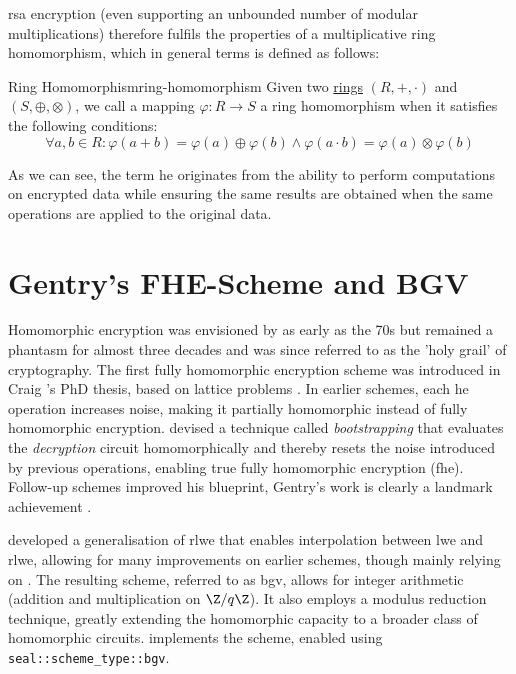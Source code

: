 \gls{rsa} encryption (even supporting an unbounded number of modular multiplications) therefore fulfils the properties of a multiplicative ring homomorphism, which in general terms is defined as follows:

\begin{definition}{Ring Homomorphism}{ring-homomorphism}
  Given two \hyperref[def:ring]{rings} $(R, +, \cdot)$ and $(S, \oplus, \otimes)$, we call a mapping $\varphi: R \rightarrow S$ a ring homomorphism when it satisfies the following conditions:
  $$\forall a, b \in R: \varphi(a + b) = \varphi(a) \oplus \varphi(b) \wedge \varphi(a \cdot b) = \varphi(a) \otimes \varphi(b)$$
\end{definition}

As we can see, the term \glsdesc{he} originates from the ability to perform computations on encrypted data while ensuring the same results are obtained when the same operations are applied to the original data.

\section{Gentry's FHE-Scheme and BGV}
Homomorphic encryption was envisioned by \citeauthor{1978-he-envisioned} as early as the 70s but remained a phantasm for almost three decades and was since referred to as the 'holy grail' of cryptography.
The first fully homomorphic encryption scheme was introduced in Craig 's PhD thesis, based on lattice problems \parencite{2009-gentry-fhe-original}.
In earlier schemes, each \gls{he} operation increases noise, making it partially homomorphic instead of fully homomorphic encryption.
 devised a technique called \textit{bootstrapping} that evaluates the \textit{decryption} circuit homomorphically and thereby resets the noise introduced by previous operations, enabling true fully homomorphic encryption (\gls{fhe}).
Follow-up schemes improved his blueprint, Gentry's work is clearly a landmark achievement \parencite{2010-first-glimpse-of-fhe}.

\cite{2012-bgv-original} developed a generalisation of \gls{rlwe} that enables interpolation between \gls{lwe} and \gls{rlwe}, allowing for many improvements on earlier schemes, though mainly relying on \cite{2009-gentry-fhe-original}.
The resulting scheme, referred to as \gls{bgv}, allows for integer arithmetic (addition and multiplication on $\Z/q\Z$). It also employs a modulus reduction technique, greatly extending the homomorphic capacity to a broader class of homomorphic circuits.
\cite{seal-4.0} implements the scheme, enabled using \texttt{seal::scheme\_type::bgv}.

